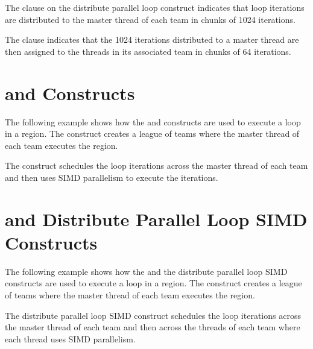 The  clause on the distribute parallel loop construct indicates 
that loop iterations are distributed to the master thread of each team in chunks 
of 1024 iterations.

The  clause indicates that the 1024 iterations distributed to 
a master thread are then assigned to the threads in its associated team in chunks 
of 64 iterations.



\section{  and   Constructs}

The following example shows how the   and  
 constructs are used to execute a loop in a  region. 
The   construct creates a league of teams where the 
master thread of each team executes the  region.

The   construct schedules the loop iterations across 
the master thread of each team and then uses SIMD parallelism to execute the iterations.



\section{  and Distribute Parallel Loop SIMD Constructs}

The following example shows how the   and the distribute 
parallel loop SIMD constructs are used to execute a loop in a   
region. The   construct creates a league of teams 
where the master thread of each team executes the  region.

The distribute parallel loop SIMD construct schedules the loop iterations across 
the master thread of each team and then across the threads of each team where each 
thread uses SIMD parallelism.



